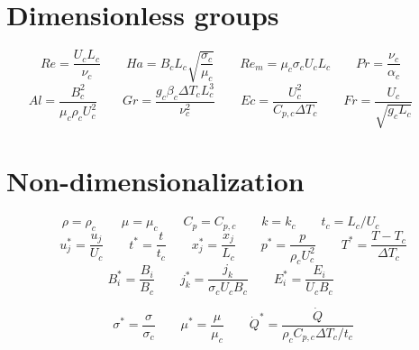 \documentclass[11pt]{article}
\begin{document}
\section{Dimensionless groups}
\begin{equation}
	Re = \frac{U_c L_c}{\nu_c} \qquad
	Ha = B_c L_c \sqrt{\frac{\sigma_c}{\mu_c}} \qquad
	Re_m = \mu_c \sigma_c U_c L_c \qquad
	Pr = \frac{\nu_c}{\alpha_c} \qquad
\end{equation}
\begin{equation}
	Al = \frac{B_c^2}{\mu_c \rho_c U_c^2} \qquad
	Gr = \frac{g_c \beta_c \Delta T_c L_c^3}{\nu_c^2} \qquad
	Ec = \frac{U_c^2}{C_{p,c} \Delta T_c} \qquad
	Fr = \frac{U_c}{\sqrt{g_c L_c}} \qquad
\end{equation}
\section{Non-dimensionalization}
\begin{equation}
	\rho = \rho_c \qquad
	\mu = \mu_c \qquad
	C_p = C_{p,c} \qquad
	k = k_c \qquad
	t_c = L_c/U_c \qquad
\end{equation}
\begin{equation}
	u_j^* = \frac{u_j}{U_c} \qquad
	t^* = \frac{t}{t_c} \qquad
	x_j^* = \frac{x_j}{L_c} \qquad
	p^* = \frac{p}{\rho_c U_c^2} \qquad
	T^* = \frac{T - T_c}{\Delta T_c}
\end{equation}
\begin{equation}
	B_i^* = \frac{B_i}{B_c}  \qquad
	j_k^* = \frac{j_k}{\sigma_c U_c B_c} \qquad
	E_i^* = \frac{E_i}{U_c B_c} \qquad
\end{equation}

\begin{equation}
	\sigma^* = \frac{\sigma}{\sigma_c} \qquad
	\mu^* = \frac{\mu}{\mu_c} \qquad
	\dot{Q}^* = \frac{\dot{Q}}{\rho_c C_{p,c} \Delta T_c / t_c}
\end{equation}
\end{document}
